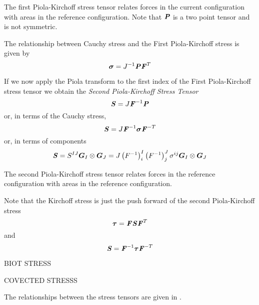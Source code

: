 The first Piola-Kirchoff stress tensor relates forces in the current
configuration with areas in the reference configuration. Note that
$\boldsymbol{\mathit{P}}$ is a two point tensor and is not symmetric.

The relationship between Cauchy stress and the First Piola-Kirchoff stress is
given by
\begin{equation}
  \boldsymbol{\mathit{\sigma}}={J}^{-1}\boldsymbol{\mathit{P}}{\boldsymbol{\mathit{F}}}^{T}
\end{equation}

If we now apply the Piola transform to the first index of the First Piola-Kirchoff stress tensor we obtain
the \emph{Second Piola-Kirchoff Stress Tensor} \ie{}
\begin{equation}
  \boldsymbol{\mathit{S}}=J{\boldsymbol{\mathit{F}}}^{-1}\boldsymbol{\mathit{P}}
\end{equation}
or, in terms of the Cauchy stress,
\begin{equation}
  \boldsymbol{\mathit{S}}=J{\boldsymbol{\mathit{F}}}^{-1}\boldsymbol{\mathit{\sigma}} {\boldsymbol{\mathit{F}}}^{-T} 
\end{equation}
or, in terms of components
\begin{equation}
  \boldsymbol{\mathit{S}}=S^{IJ} \boldsymbol{G}_{I} \otimes \boldsymbol{G}_{J} =J\left( {F}^{-1} \right)^{I}_{i}\left( {F}^{-1} \right)^{J}_{j}\sigma^{ij} \boldsymbol{G}_{I} \otimes \boldsymbol{G}_{J} 
\end{equation}

The second Piola-Kirchoff stress tensor relates forces in the reference
configuration with areas in the reference configuration.

Note that the Kirchoff stress is just the push forward of the second
Piola-Kirchoff stress \ie
\begin{equation}
  \boldsymbol{\mathit{\tau}}=\boldsymbol{\mathit{F}}\boldsymbol{\mathit{S}}{\boldsymbol{\mathit{F}}}^{T}
\end{equation}
and
\begin{equation}
  \boldsymbol{\mathit{S}}={\boldsymbol{\mathit{F}}}^{-1}\boldsymbol{\mathit{\tau}} {\boldsymbol{\mathit{F}}}^{-T} 
\end{equation}

BIOT STRESS

COVECTED STRESSS


The relationships between the stress tensors are given in .

